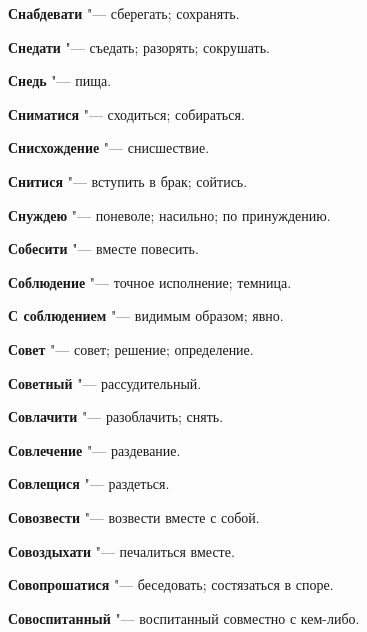 \begin{mymulticols}{2}
\noindent\textbf{Снабдевати} "--- сберегать; сохранять. 




\noindent\textbf{Снедати} "--- съедать; разорять; сокрушать. 




\noindent\textbf{Снедь} "--- пища. 




\noindent\textbf{Сниматися} "--- сходиться; собираться. 




\noindent\textbf{Снисхождение} "--- снисшествие. 




\noindent\textbf{Снитися} "--- вступить в брак; сойтись. 




\noindent\textbf{Снуждею} "--- поневоле; насильно; по принуждению. 




\noindent\textbf{Собесити} "--- вместе повесить. 




\noindent\textbf{Соблюдение} "--- точное исполнение; темница. 




\noindent\textbf{С соблюдением} "--- видимым образом; явно. 




\noindent\textbf{Совет} "--- совет; решение; определение. 




\noindent\textbf{Советный} "--- рассудительный. 




\noindent\textbf{Совлачити} "--- разоблачить; снять. 




\noindent\textbf{Совлечение} "--- раздевание. 




\noindent\textbf{Совлещися} "--- раздеться. 




\noindent\textbf{Совозвести} "--- возвести вместе с собой. 




\noindent\textbf{Совоздыхати} "--- печалиться вместе. 




\noindent\textbf{Совопрошатися} "--- беседовать; состязаться в споре. 




\noindent\textbf{Совоспитанный} "--- воспитанный совместно с кем-либо. 





\end{mymulticols}
